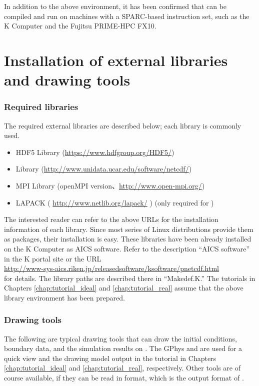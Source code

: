 In addition to the above environment, it has been confirmed that \scalelib can be compiled and run on  machines with a SPARC-based instruction set, such as the K Computer and the Fujitsu PRIME-HPC FX10.


\section{Installation of external libraries and drawing tools} \label{sec:inst_env}
\subsubsection{Required libraries}
The required external libraries are described below; each library is commonly used.
\begin{itemize}
\item HDF5 Library (\url{https://www.hdfgroup.org/HDF5/})
\item {\netcdf} Library (\url{http://www.unidata.ucar.edu/software/netcdf/})
\item MPI Library (openMPI version、\url{http://www.open-mpi.org/})
\item LAPACK ( \url{http://www.netlib.org/lapack/} ) (only required for \scalegm)
\end{itemize}
The interested reader can refer to the above URLs for the installation information of each library.  Since most series of Linux distributions provide them as packages, their installation is easy. These libraries have been already installed on the K Computer as AICS software. Refer to the description ``AICS software'' in the K portal site or the URL\\ \url{http://www-sys-aics.riken.jp/releasedsoftware/ksoftware/pnetcdf.html}\\ for details. The library paths are described there in ``Makedef.K.'' The tutorials in Chapters \ref{chap:tutorial_ideal} and \ref{chap:tutorial_real} assume that the above library environment has been prepared.


\subsubsection{Drawing tools}
The following are typical drawing tools that can draw
the initial conditions, boundary data, and the simulation results on \scalelib.
The GPhys and \grads are used for a quick view
and the drawing model output in the tutorial in Chapters \ref{chap:tutorial_ideal} and \ref{chap:tutorial_real}, respectively.
Other tools are of course available,
if they can be read in \netcdf format, which is the output format of \scalelib.

